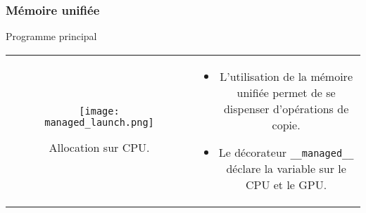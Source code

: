 \begin{frame}[fragile]
    \frametitle{Mémoire unifiée}
\begin{block}{Programme principal}
   \begin{tabular}{cc}
        \begin{minipage}{0.45\textwidth}
 \begin{figure}[htbp]
    \centering
   \texttt{[image: managed\_launch.png]}
    \caption{Allocation sur CPU.}
    \label{fig:managed_launch}
\end{figure}
        \end{minipage} & 
        \begin{minipage}{0.45\textwidth}
            \begin{itemize}
                \item<+-> L'utilisation de la mémoire unifiée permet de se dispenser d'opérations de copie.
                \item<+-> Le décorateur \texttt{\_\_managed\_\_} déclare la variable sur le CPU et le GPU.
           \end{itemize}
        \end{minipage}
\end{tabular}
\end{block}
\end{frame}